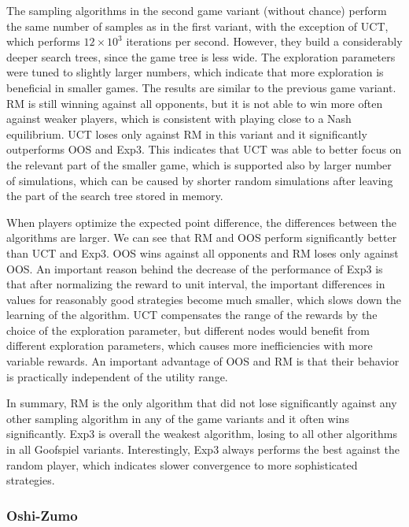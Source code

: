 {The sampling algorithms in the second game variant (without chance) perform 
the same number of samples as in the first variant, with the exception of UCT, which performs $12 \times 10^3$ iterations per second.
However, they build a considerably deeper search trees, since the game tree is less wide.
The exploration parameters were tuned to slightly larger numbers, which indicate that more exploration is beneficial in smaller games.
The results are similar to the previous game variant.
RM is still winning against all opponents, but it is not able to win more often against weaker players, which is consistent with playing close to a Nash equilibrium.
UCT loses only against RM in this variant and it significantly outperforms OOS and Exp3.
This indicates that UCT was able to better focus on the relevant part of the smaller game, which is supported also by larger number of simulations, which can be caused by shorter random simulations after leaving the part of the search tree stored in memory.

When players optimize the expected point difference, the differences between the algorithms are larger. 
We can see that RM and OOS perform significantly better than UCT and Exp3.
OOS wins against all opponents and RM loses only against OOS.
An important reason behind the decrease of the performance of Exp3 is that after normalizing the reward to unit interval, the important differences in values for reasonably good strategies become much smaller, which slows down the learning of the algorithm.
UCT compensates the range of the rewards by the choice of the exploration parameter, but different nodes would benefit from different exploration parameters, which causes more inefficiencies with more variable rewards.
An important advantage of OOS and RM is that their behavior is practically independent of the utility range.

In summary, RM is the only algorithm that did not lose significantly against any other sampling algorithm in any of the game variants and it often wins significantly.
Exp3 is overall the weakest algorithm, losing to all other algorithms in all Goofspiel variants.
Interestingly, Exp3 always performs the best against the random player, which indicates slower convergence to more sophisticated strategies.}

\subsubsection{Oshi-Zumo}

